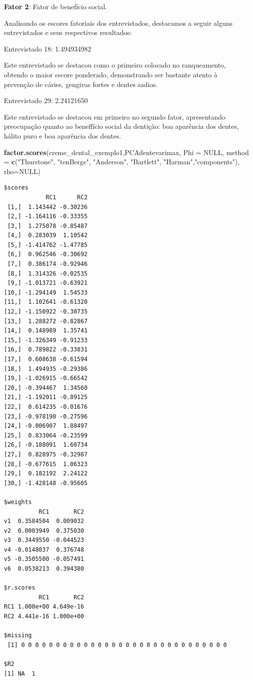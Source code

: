 \documentclass[12pt,brazil,oneside]{book}
\newenvironment{Shaded}{\begin{snugshade}}{\end{snugshade}}
\newcommand{\DataTypeTok}[1]{\textcolor[rgb]{0.13,0.29,0.53}{#1}}
\newcommand{\KeywordTok}[1]{\textcolor[rgb]{0.13,0.29,0.53}{\textbf{#1}}}
\newcommand{\NormalTok}[1]{#1}
\newcommand{\OtherTok}[1]{\textcolor[rgb]{0.56,0.35,0.01}{#1}}
\newcommand{\StringTok}[1]{\textcolor[rgb]{0.31,0.60,0.02}{#1}}
\begin{document}
\textbf{Fator 2}: Fator de benefício social.

Analisando os escores fatoriais dos entrevistados, destacamos a seguir
alguns entrevistados e seus respectivos resultados:

Entrevistado 18: 1.494934982

Este entrevistado se destacou como o primeiro colocado no ranqueamento,
obtendo o maior escore ponderado, demonstrando ser bastante atento à
prevenção de cáries, gengivas fortes e dentes sadios.

Entrevistado 29: 2.24121650

Este entrevistado se destacou em primeiro no segundo fator, apresentando
preocupação quanto ao beneffício social da dentição: boa aparência dos
dentes, hálito puro e boa aparência dos dentes.

\begin{Shaded}
\begin{Highlighting}[]
\KeywordTok{factor.scores}\NormalTok{(creme_dental_exemplo1,PCAdentevarimax, }
              \DataTypeTok{Phi =} \OtherTok{NULL}\NormalTok{, }
              \DataTypeTok{method =} \KeywordTok{c}\NormalTok{(}\StringTok{"Thurstone"}\NormalTok{, }\StringTok{"tenBerge"}\NormalTok{, }\StringTok{"Anderson"}\NormalTok{, }\StringTok{"Bartlett"}\NormalTok{, }\StringTok{"Harman"}\NormalTok{,}\StringTok{"components"}\NormalTok{),}
              \DataTypeTok{rho=}\OtherTok{NULL}\NormalTok{)}
\end{Highlighting}
\end{Shaded}

\begin{verbatim}
$scores
            RC1      RC2
 [1,]  1.143442 -0.30236
 [2,] -1.164116 -0.33355
 [3,]  1.275078 -0.85487
 [4,]  0.283039  1.10542
 [5,] -1.414762 -1.47785
 [6,]  0.962546 -0.30692
 [7,]  0.386174 -0.92946
 [8,]  1.314326 -0.02535
 [9,] -1.013721 -0.63921
[10,] -1.294149  1.54533
[11,]  1.102641 -0.61320
[12,] -1.150922 -0.30735
[13,]  1.288272 -0.82867
[14,]  0.148989  1.35741
[15,] -1.326349 -0.91233
[16,]  0.789822 -0.33831
[17,]  0.608638 -0.61594
[18,]  1.494935 -0.29386
[19,] -1.026915 -0.66542
[20,] -0.394467  1.34560
[21,] -1.192011 -0.89125
[22,]  0.614235 -0.01676
[23,] -0.978198 -0.27596
[24,] -0.006907  1.88497
[25,]  0.833064 -0.23599
[26,] -0.188091  1.60734
[27,]  0.828975 -0.32987
[28,] -0.677615  1.06323
[29,]  0.182192  2.24122
[30,] -1.428148 -0.95605

$weights
          RC1       RC2
v1  0.3584504  0.009032
v2  0.0003949  0.375030
v3  0.3449550 -0.044523
v4 -0.0148037  0.376748
v5 -0.3505500 -0.057491
v6  0.0538213  0.394380

$r.scores
          RC1       RC2
RC1 1.000e+00 4.649e-16
RC2 4.441e-16 1.000e+00

$missing
 [1] 0 0 0 0 0 0 0 0 0 0 0 0 0 0 0 0 0 0 0 0 0 0 0 0 0 0 0 0 0 0

$R2
[1] NA  1
\end{verbatim}
\end{document}

